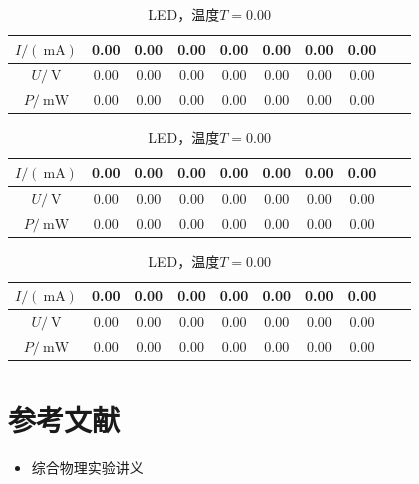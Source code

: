 \documentclass{ctexart}
\newcommand{\si}[1]{\  \mathrm{#1}}
\begin{document}
    \newpage
    \begin{table}[H]
        \centering
        \begin{tabular}{|c|c|c|c|c|c|c|c|c|c|}
            \hline
            $I/(\si{mA})$ & 0.00 & 0.00 & 0.00 & 0.00 & 0.00 & 0.00 & 0.00 \\\hline
            $U / \si{V}$  & 0.00 & 0.00 & 0.00 & 0.00 & 0.00 & 0.00 & 0.00 \\\hline
            $P / \si{mW}$ & 0.00 & 0.00 & 0.00 & 0.00 & 0.00 & 0.00 & 0.00 \\\hline
        \end{tabular}
        \caption{LED，温度$T=0.00$}
    \end{table}
    \newpage
    \begin{table}[H]
        \centering
        \begin{tabular}{|c|c|c|c|c|c|c|c|c|c|}
            \hline
            $I/(\si{mA})$ & 0.00 & 0.00 & 0.00 & 0.00 & 0.00 & 0.00 & 0.00 \\\hline
            $U / \si{V}$  & 0.00 & 0.00 & 0.00 & 0.00 & 0.00 & 0.00 & 0.00 \\\hline
            $P / \si{mW}$ & 0.00 & 0.00 & 0.00 & 0.00 & 0.00 & 0.00 & 0.00 \\\hline
        \end{tabular}
        \caption{LED，温度$T=0.00$}
    \end{table}
    \newpage
    \begin{table}[H]
        \centering
        \begin{tabular}{|c|c|c|c|c|c|c|c|c|c|}
            \hline
            $I/(\si{mA})$ & 0.00 & 0.00 & 0.00 & 0.00 & 0.00 & 0.00 & 0.00 \\\hline
            $U / \si{V}$  & 0.00 & 0.00 & 0.00 & 0.00 & 0.00 & 0.00 & 0.00 \\\hline
            $P / \si{mW}$ & 0.00 & 0.00 & 0.00 & 0.00 & 0.00 & 0.00 & 0.00 \\\hline
        \end{tabular}
        \caption{LED，温度$T=0.00$}
    \end{table}
    \newpage


    \section{参考文献}
    \begin{itemize}[leftmargin=0pt]
        \item[] 综合物理实验讲义
    \end{itemize}
\end{document}
